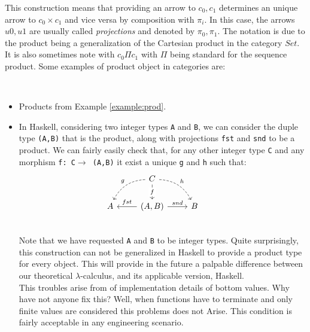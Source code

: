 This construction means that providing an arrow to $c_0,c_1$ determines an unique arrow to $c_0\times c_1$ and vice versa by composition with $\pi_i$. In this case, the arrows $u0, u1$ are usually called \emph{projections} and denoted by $\pi_0, \pi_1$. The notation is due to the product being a generalization of the Cartesian product in the category $Set$. It is also sometimes note with $c_0 \Pi c_1$ with $\Pi$ being standard for the sequence product. Some examples of product object in categories are:
\begin{example}\ 
  \begin{itemize}
  \item Products from Example \ref{example:prod}.
  \item In Haskell, considering two integer types \texttt{A} and \texttt{B}, we can consider the duple type \texttt{(A,B)} that is the product, along with projections \texttt{fst} and \texttt{snd} to be a product. We can fairly easily check that, for any other integer type \texttt{C} and any morphism \texttt{f: C$\to$ (A,B)} it exist a unique \texttt{g} and \texttt{h} such that:
    \[
      \begin{tikzcd}
        {} & C \arrow[bend right,swap,dashed]{dl}{g}
        \arrow[bend left,dashed]{dr}{h} \arrow{d}[description]{f}& & \\
        A  &(A,B) \arrow{l}[swap]{fst} \arrow{r}{snd} & 
        B \\
      \end{tikzcd}
    \]
    Note that we have requested \texttt{A} and \texttt{B} to be integer types. Quite surprisingly, this construction can not be generalized in Haskell to provide a product type for every object\cite{wiki:hask}. This will provide in the future a palpable difference between our theoretical $\lambda$-calculus, and its applicable version,  Haskell.\\

    This troubles arise from of implementation details of bottom values. Why have not anyone fix this? Well, when functions have to terminate and only finite values are considered this problems does not Arise. This condition is fairly acceptable in any engineering scenario. 
  \end{itemize}
\end{example}

